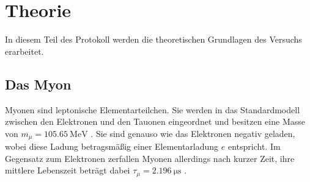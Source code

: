 \section{Theorie}
\label{sec:theorie}
In diesem Teil des Protokoll werden die theoretischen Grundlagen des Versuchs erarbeitet.
\subsection{Das Myon}
Myonen sind leptonische Elementarteilchen.
Sie werden in das Standardmodell zwischen den Elektronen und den Tauonen eingeordnet und besitzen eine Masse von $m_\mu = \SI{105.65}{\mega\eV}$ \cite{myonen}.
Sie sind genauso wie das Elektronen negativ geladen, wobei diese Ladung betragsmäßig einer Elementarladung $e$ entspricht.
Im Gegensatz zum Elektronen zerfallen Myonen allerdings nach kurzer Zeit, ihre mittlere Lebenszeit beträgt dabei $\tau_\mu = \SI{2.196}{\micro\second}$ \cite{myonen}.
